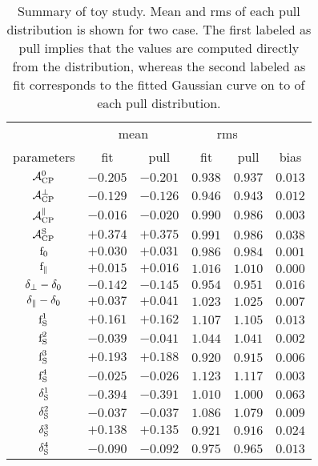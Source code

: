 \begin{table}[!h]
  \centering
  \footnotesize
  \begin{tabular}{c c c c c | c}
    \cline{2-5}
               & \multicolumn{2}{c}{mean} & \multicolumn{2}{c}{rms} &  \\
    \cline{2-6}
    parameters & fit & pull & fit & pull & bias \\
    \cline{1-6}
    $                  \mathcal{A}_{\rm CP}^{0}$ & $-0.205$ & $-0.201$ & $0.938$ & $0.937$  & $0.013$ \\
    $              \mathcal{A}_{\rm CP}^{\perp}$ & $-0.129$ & $-0.126$ & $0.946$ & $0.943$  & $0.012$ \\
    $          \mathcal{A}_{\rm CP}^{\parallel}$ & $-0.016$ & $-0.020$ & $0.990$ & $0.986$  & $0.003$ \\
    $                  \mathcal{A}_{\rm CP}^{\rm S}$ & $+0.374$ & $+0.375$ & $0.991$ & $0.986$  & $0.038$ \\
    \hline
    $                   \text{f}_{0}$ & $+0.030$ & $+0.031$ & $0.986$ & $0.984$  & $0.001$ \\
    $           \text{f}_{\parallel}$ & $+0.015$ & $+0.016$ & $1.016$ & $1.010$  & $0.000$ \\
    $         \delta_{\perp}-\delta_{0}$ & $-0.142$ & $-0.145$ & $0.954$ & $0.951$  & $0.016$ \\
    $     \delta_{\parallel}-\delta_{0}$ & $+0.037$ & $+0.041$ & $1.023$ & $1.025$  & $0.007$ \\
    \hline
    $                   \text{f}_{\text{S}}^{1}$ & $+0.161$ & $+0.162$ & $1.107$ & $1.105$  & $0.013$ \\
    $                   \text{f}_{\text{S}}^{2}$ & $-0.039$ & $-0.041$ & $1.044$ & $1.041$  & $0.002$ \\
    $                   \text{f}_{\text{S}}^{3}$ & $+0.193$ & $+0.188$ & $0.920$ & $0.915$  & $0.006$ \\
    $                   \text{f}_{\text{S}}^{4}$ & $-0.025$ & $-0.026$ & $1.123$ & $1.117$  & $0.003$ \\
    $               \delta_{\text{S}}^{1}$ & $-0.394$ & $-0.391$ & $1.010$ & $1.000$  & $0.063$ \\
    $               \delta_{\text{S}}^{2}$ & $-0.037$ & $-0.037$ & $1.086$ & $1.079$  & $0.009$ \\
    $               \delta_{\text{S}}^{3}$ & $+0.138$ & $+0.135$ & $0.921$ & $0.916$  & $0.024$ \\
    $               \delta_{\text{S}}^{4}$ & $-0.090$ & $-0.092$ & $0.975$ & $0.965$  & $0.013$ \\
  \end{tabular}
  \caption{Summary of toy study. Mean and rms of each pull distribution is shown for two case.
           The first labeled as pull implies that the values are computed directly from the distribution,
           whereas the second labeled as fit corresponds to the fitted Gaussian curve on to of each pull distribution.}
  \label{pull_table}
\end{table}
